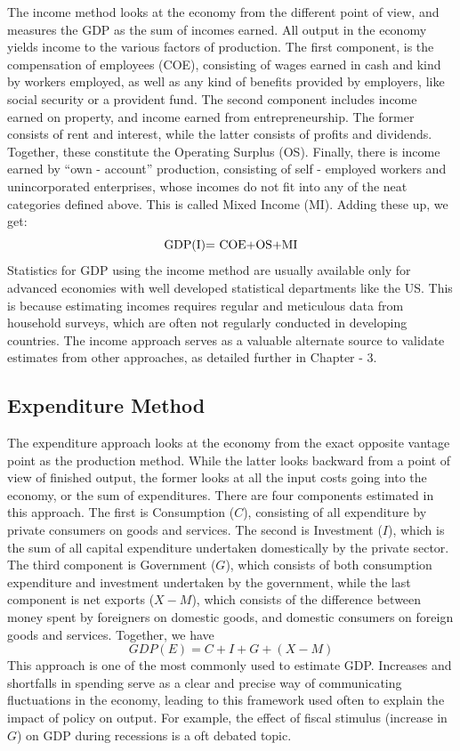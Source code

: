 \documentclass[12pt,nobind, a4paper]{reedthesis}
\begin{document}
 The income method looks at the economy from the different point of view, and measures the GDP as the sum of incomes earned. All output in the economy yields income to the various factors of production. The first component, is the compensation of employees (COE), consisting of wages earned in cash and kind by workers employed, as well as any kind of benefits provided by employers, like social security or a provident fund. The second component includes income earned on property, and income earned from entrepreneurship. The former consists of rent and interest, while the latter consists of profits and dividends. Together, these constitute the Operating Surplus (OS). Finally, there is income earned by ``own - account'' production, consisting of self - employed workers and unincorporated enterprises, whose incomes do not fit into any of the neat categories defined above. This is called Mixed Income (MI). Adding these up, we get:
 \begin{equation}
 \text{GDP(I)= \text{COE}+\text{OS}+\text{MI}}
 \end{equation}
 Statistics for GDP using the income method are usually available only for advanced economies with well developed statistical departments like the US. This is because estimating incomes requires regular and meticulous data from household surveys, which are often not regularly conducted in developing countries. The income approach serves as a valuable alternate source to validate estimates from other approaches, as detailed further in Chapter - 3.

 \hypertarget{expenditure-method}{%
 \subsection{Expenditure Method}\label{expenditure-method}}

 The expenditure approach looks at the economy from the exact opposite vantage point as the production method. While the latter looks backward from a point of view of finished output, the former looks at all the input costs going into the economy, or the sum of expenditures. There are four components estimated in this approach. The first is Consumption (\(C\)), consisting of all expenditure by private consumers on goods and services. The second is Investment (\(I\)), which is the sum of all capital expenditure undertaken domestically by the private sector. The third component is Government (\(G\)), which consists of both consumption expenditure and investment undertaken by the government, while the last component is net exports (\(X-M\)), which consists of the difference between money spent by foreigners on domestic goods, and domestic consumers on foreign goods and services. Together, we have
 \begin{equation}
 GDP (E)=C+I+G+(X-M)
 \end{equation}
 This approach is one of the most commonly used to estimate GDP. Increases and shortfalls in spending serve as a clear and precise way of communicating fluctuations in the economy, leading to this framework used often to explain the impact of policy on output. For example, the effect of fiscal stimulus (increase in \(G\)) on GDP during recessions is a oft debated topic.
 \linebreak
\end{document}
